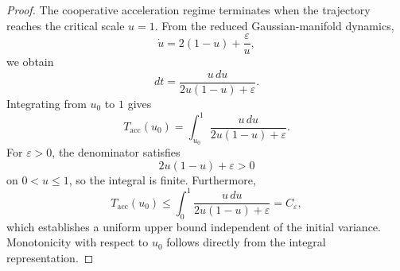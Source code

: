 \documentclass[10pt,a4paper]{amsart}
\begin{document}
\begin{proof}
The cooperative acceleration regime terminates when the trajectory reaches the critical scale $u=1$. From the reduced Gaussian-manifold dynamics,
\[
\dot u
=
2(1-u)
+
\frac{\varepsilon}{u},
\]
we obtain
\[
dt
=
\frac{u\,du}
{2u(1-u)+\varepsilon}.
\]
Integrating from $u_0$ to $1$ gives
\[
T_{\mathrm{acc}}(u_0)
=
\int_{u_0}^{1}
\frac{u\,du}
{2u(1-u)+\varepsilon}.
\]
For $\varepsilon>0$, the denominator satisfies
\[
2u(1-u)+\varepsilon>0
\]
on $0<u\leq 1$, so the integral is finite. Furthermore,
\[
T_{\mathrm{acc}}(u_0)
\le
\int_{0}^{1}
\frac{u\,du}
{2u(1-u)+\varepsilon}
=
C_\varepsilon,
\]
which establishes a uniform upper bound independent of the initial variance. Monotonicity with respect to $u_0$ follows directly from the integral representation.
\end{proof}
\end{document}

